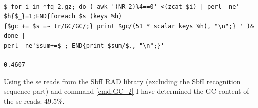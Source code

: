 \documentclass[a4paper,12pt,times,print,index, custombib]{PhDThesisPSnPDF}\usepackage[]{graphicx}\usepackage[]{color}
\begin{document}
\begin{cmd}
\captionsetup{type=cmd} %
\begin{Verbatim}[formatcom=\color{darkgray}, fontsize=\scriptsize]

$ for i in *fq_2.gz; do ( awk '(NR-2)%4==0' <(zcat $i) | perl -ne' $h{$_}=1;END{foreach $s (keys %h)
{$gc += $s =~ tr/GC/GC/;} print $gc/(51 * scalar keys %h), "\n";} ' )& done | 
perl -ne'$sum+=$_; END{print $sum/$., "\n";}'

0.4607
\end{Verbatim}
\caption[Determine GC content from standard RAD PE reads]{\small For each individual, this command takes the \glspl{pe} reads, uniques them and determines their overall GC content. Finally, the average of the individual GC contents is taken. Note the brute-force parallelisation by sending each iteration of the \texttt{for} loop into the background with \texttt{(\ldots )\&}.}
\label{cmd:GC_1}
\end{cmd}

Using the \gls{se} reads from the \gls{SbfI} RAD library (excluding the SbfI recognition sequence part) and command \ref{cmd:GC_2} I have determined the GC content of the \gls{se} reads: 49.5\%.

\begin{cmd}
\captionsetup{type=cmd} %
\caption[Determine GC content of \gls{se} reads]{\small This command is a different version of command \ref{cmd:GC_1}. However, it is used here to determine the GC content of all \gls{se} reads from the standard \gls{SbfI} RAD library. It first creates and exports two functions, \texttt{gc} and \texttt{mean}, and then uses the programme \texttt{parallel} in order to parallelise the determination of GC content over 10 cores. After stripping barcode and the remainder of the restriction site, the reads are 40 base pairs long. Note, the space between \{ and \texttt{awk} (line 1) as well as \{ and \texttt{perl} (line 4) is required.}
\label{cmd:GC_2}
\end{cmd}
\end{document}
